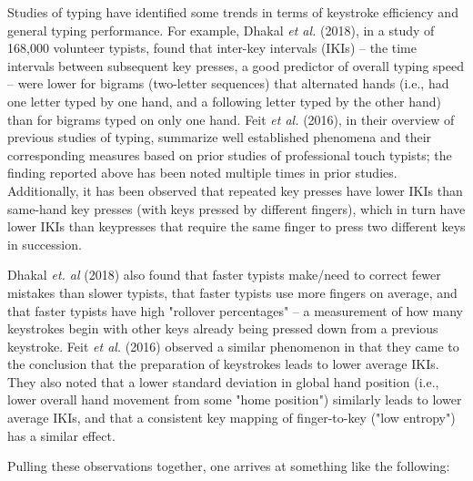 \documentclass[11pt]{article}
\begin{document}
Studies of typing have identified some trends in terms of keystroke efficiency and general typing performance. For example, Dhakal \emph{et al.} (2018), in a study of 168,000 volunteer typists, found that inter-key intervals (IKIs) -- the time intervals between subsequent key presses, a good predictor of overall typing speed -- were lower for bigrams (two-letter sequences) that alternated hands (i.e., had one letter typed by one hand, and a following letter typed by the other hand) than for bigrams typed on only one hand. Feit \emph{et al.} (2016), in their overview of previous studies of typing, summarize well established phenomena and their corresponding measures based on prior studies of professional touch typists; the finding reported above has been noted multiple times in prior studies. Additionally, it has been observed that repeated key presses have lower IKIs than same-hand key presses (with keys pressed by different fingers), which in turn have lower IKIs than keypresses that require the same finger to press two different keys in succession.

Dhakal \emph{et. al} (2018) also found that faster typists make/need to correct fewer mistakes than slower typists, that faster typists use more fingers on average, and that faster typists have high "rollover percentages" -- a measurement of how many keystrokes begin with other keys already being pressed down from a previous keystroke. Feit \emph{et al.} (2016) observed a similar phenomenon in that they came to the conclusion that the preparation of keystrokes leads to lower average IKIs. They also noted that a lower standard deviation in global hand position (i.e., lower overall hand movement from some "home position") similarly leads to lower average IKIs, and that a consistent key mapping of finger-to-key ("low entropy") has a similar effect.

Pulling these observations together, one arrives at something like the following:
\end{document}
